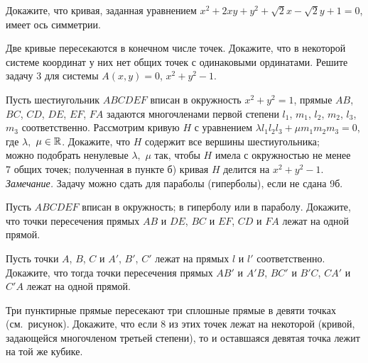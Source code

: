 \documentclass[a4paper, 11pt]{article}
\begin{document}
 Докажите, что кривая, заданная уравнением $x^2 + 2xy + y^2 +
\sqrt2x - \sqrt2y + 1 = 0$, имеет ось симметрии.

Две кривые пересекаются в конечном числе точек. Докажите, что в некоторой системе координат у них нет общих точек с одинаковыми ординатами.
Решите задачу 3 для системы $A(x,y)=0$, $x^2+y^2-1$.



 Пусть шестиугольник
$ABCDEF$ вписан в окружность $x^2+y^2=1$,
прямые $AB$, $BC$, $CD$, $DE$, $EF$, $FA$ задаются многочленами
первой степени $l_1$, $m_1$, $l_2$, $m_2$, $l_3$, $m_3$ соответственно.
Рассмотрим кривую $H$ с уравнением $\lambda l_1l_2l_3+\mu m_1m_2m_3=0$, где $\lambda,$ $\mu\in\mathbb{R}$.
Докажите, что
 $H$ содержит все вершины шестиугольника;\\
 можно подобрать ненулевые $\lambda,$ $\mu$ так, чтобы $H$ имела с окружностью не менее\\ 7 общих точек;
 полученная в пункте б) кривая $H$ делится на $x^2+y^2-1$. \\
{\em Замечание.} Задачу можно сдать для параболы (гиперболы), если не сдана 9б.


\vspace*{-5mm}

 Пусть $ABCDEF$ вписан  в окружность;
 в гиперболу или в параболу. Докажите, что точки пересечения прямых $AB$ и $DE$, $BC$ и $EF$, $CD$ и $FA$ лежат на одной прямой.

 Пусть точки $A$, $B$, $C$ и $A'$, $B'$, $C'$
лежат на прямых $l$ и $l'$ соответственно.
Докажите, что тогда точки пересечения прямых
$AB'$ и $A'B$, $BC'$ и $B'C$, $CA'$ и $C'A$ лежат на одной прямой.


\vspace*{-.4cm}
Три пунктирные прямые пересекают три сплошные прямые в
девяти точках (см.~рисунок). Докажите, что если 8
из этих точек лежат на некоторой  (кривой, задающейся многочленом третьей степени), то и оставшаяся
девятая точка лежит на той же кубике. 
\end{document}
